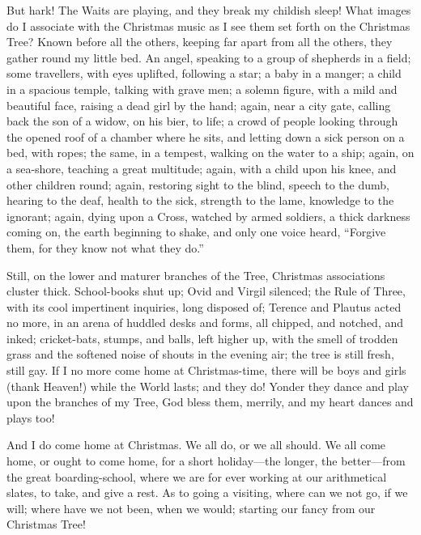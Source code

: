 But hark!  The Waits are playing, and they break my childish sleep!
What images do I associate with the Christmas music as I see them
set forth on the Christmas Tree?  Known before all the others,
keeping far apart from all the others, they gather round my little
bed.  An angel, speaking to a group of shepherds in a field; some
travellers, with eyes uplifted, following a star; a baby in a
manger; a child in a spacious temple, talking with grave men; a
solemn figure, with a mild and beautiful face, raising a dead girl
by the hand; again, near a city gate, calling back the son of a
widow, on his bier, to life; a crowd of people looking through the
opened roof of a chamber where he sits, and letting down a sick
person on a bed, with ropes; the same, in a tempest, walking on the
water to a ship; again, on a sea-shore, teaching a great multitude;
again, with a child upon his knee, and other children round; again,
restoring sight to the blind, speech to the dumb, hearing to the
deaf, health to the sick, strength to the lame, knowledge to the
ignorant; again, dying upon a Cross, watched by armed soldiers, a
thick darkness coming on, the earth beginning to shake, and only one
voice heard, ``Forgive them, for they know not what they do.''

Still, on the lower and maturer branches of the Tree, Christmas
associations cluster thick.  School-books shut up; Ovid and Virgil
silenced; the Rule of Three, with its cool impertinent inquiries,
long disposed of; Terence and Plautus acted no more, in an arena of
huddled desks and forms, all chipped, and notched, and inked;
cricket-bats, stumps, and balls, left higher up, with the smell of
trodden grass and the softened noise of shouts in the evening air;
the tree is still fresh, still gay.  If I no more come home at
Christmas-time, there will be boys and girls (thank Heaven!) while
the World lasts; and they do!  Yonder they dance and play upon the
branches of my Tree, God bless them, merrily, and my heart dances
and plays too!

And I do come home at Christmas.  We all do, or we all should.  We
all come home, or ought to come home, for a short holiday---the
longer, the better---from the great boarding-school, where we are for
ever working at our arithmetical slates, to take, and give a rest.
As to going a visiting, where can we not go, if we will; where have
we not been, when we would; starting our fancy from our Christmas
Tree!

